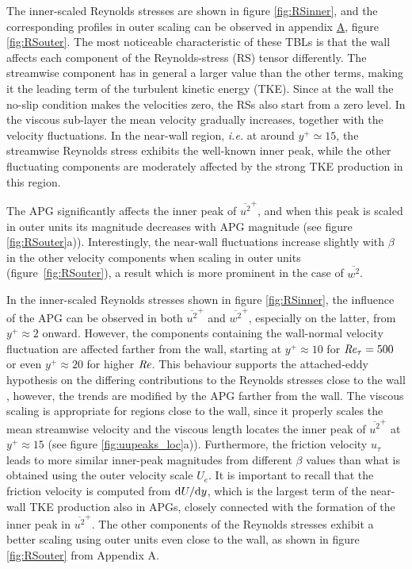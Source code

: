The inner-scaled Reynolds stresses are shown in figure \ref{fig:RSinner}, and the corresponding profiles in outer scaling can be observed in appendix \hyperlink{AppA}{A}, figure \ref{fig:RSouter}. 
The most noticeable characteristic of these TBLs is that the wall affects each component of the Reynolds-stress (RS) tensor differently. The streamwise component has in general a larger value than the other terms, making it the leading term of the turbulent kinetic energy (TKE). Since at the wall the no-slip condition makes the velocities zero, the RSs also start from a zero level. In the viscous sub-layer the mean velocity gradually increases, together with the velocity fluctuations. 
In the near-wall region, {\it i.e.} at around $y^+\simeq 15$, the streamwise Reynolds stress exhibits the well-known inner peak, while the other fluctuating components are moderately affected by the strong TKE production in this region.

The APG significantly affects the inner peak of $\overline{u^2}^+$, and when this peak is scaled in outer units its magnitude decreases with APG magnitude (see figure \ref{fig:RSouter}a)). Interestingly, the near-wall fluctuations increase slightly with $\beta$ in the other velocity components when scaling in outer units (figure~\ref{fig:RSouter}), a result which is more prominent in the case of $\overline{w^2}$.

In the inner-scaled Reynolds stresses shown in figure \ref{fig:RSinner}, the influence of the APG can be observed in both $\overline{u^2}^+$ and $\overline{w^2}^+$, especially on the latter, from $y^+ \approx 2$ onward. However, the components containing the wall-normal velocity fluctuation are affected farther from the wall, starting at $y^+ \approx 10$ for $\mbox{\textit{Re}}_{\tau}=500$ or even $y^+ \approx 20$ for higher $\mbox{\textit{Re}}$. This behaviour supports the attached-eddy hypothesis on the differing contributions to the Reynolds stresses close to the wall \citep{Townsend_1976, deshpande_2021}, however, the trends are modified by the APG farther from the wall. 
The viscous scaling is appropriate for regions close to the wall, since it properly scales the mean streamwise velocity and the viscous length locates the inner peak of $\overline{u^2}^+$ at $y^+\approx 15$ (see figure \ref{fig:uupeaks_loc}a)). Furthermore, the friction velocity $u_{\tau}$ leads to more similar inner-peak magnitudes from different $\beta$ values than what is obtained using the outer velocity scale $U_{e}$. It is important to recall that the friction velocity is computed from ${\rm d}U / {\rm d} y$, which is the largest term of the near-wall TKE production also in APGs, closely connected with the formation of the inner peak in $\overline{u^2}^+$. The other components of the Reynolds stresses exhibit a better scaling using outer units even close to the wall, as shown in figure \ref{fig:RSouter} from Appendix A. 

